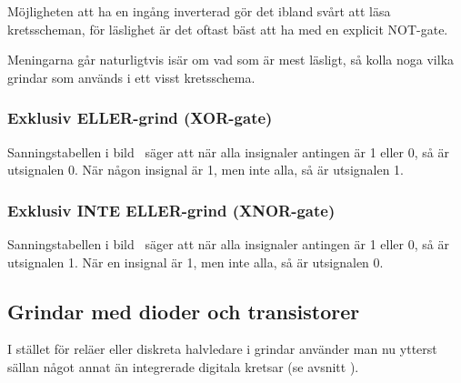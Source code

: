 Möjligheten att ha en ingång inverterad gör det ibland svårt att läsa
kretsscheman, för läslighet är det oftast bäst att ha med en explicit NOT-gate.

Meningarna går naturligtvis isär om vad som är mest läsligt, så kolla
noga vilka grindar som används i ett visst kretsschema.



\subsubsection{Exklusiv ELLER-grind (XOR-gate)}

Sanningstabellen i bild~ säger att när alla insignaler
antingen är 1 eller 0, så är utsignalen 0.
När någon insignal är 1, men inte alla, så är utsignalen 1.

\subsubsection{Exklusiv INTE ELLER-grind (XNOR-gate)}

Sanningstabellen i bild~ säger att när alla insignaler
antingen är 1 eller 0, så är utsignalen 1.
När en insignal är 1, men inte alla, så är utsignalen 0.

\subsection{Grindar med dioder och transistorer}

I stället för reläer eller diskreta halvledare i grindar använder man nu ytterst
sällan något annat än integrerade digitala kretsar (se avsnitt
).


